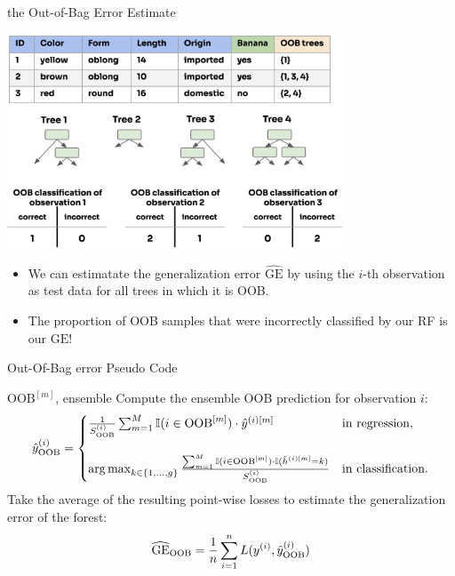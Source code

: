 \documentclass[11pt,compress,t,notes=noshow,xcolor=table]{beamer}
\begin{document}
\begin{vbframe}{the Out-of-Bag Error Estimate}
  
\begin{center}
  \includegraphics[width=0.75\textwidth]{figure_man/forest-oob-error.png}
\end{center}

\begin{itemize}
  \item We can estimatate the generalization error $\widehat{\mathrm{GE}}$ by using the $i$-th observation as test data for all trees in which it is OOB. 
  \item The proportion of OOB samples that were incorrectly classified by our RF is our $\widehat{\mathrm{GE}}$!
\end{itemize}

\end{vbframe}

\begin{vbframe}{Out-Of-Bag error Pseudo Code}
\begin{algorithm}[H]
  \footnotesize
  \caption*{Out-Of-Bag error calculation}
  \begin{algorithmic}[1]
     $\text{OOB}^{[m]}$, ensemble
      \State Compute the ensemble OOB prediction for observation $i$:
      $$\hat{y}^{(i)}_{\text{OOB}} = \begin{cases}
      \frac{1}{S_{\text{OOB}}^{(i)}} \sum_{m = 1}^{M} 
      \mathbb{I}(i \in \text{OOB}^{[m]}) \cdot \hat{y}^{(i)[m]} & \text{in regression,} 
      \\ \phantom{x} \\
      \operatorname*{arg\,max}_{k \in \{1, \ldots, g\}} 
      \frac{\sum_{m = 1}^{M} \mathbb{I}(i \in \text{OOB}^{[m]}) \cdot 
      \mathbb{I}(\hat{h}^{(i)[m]} = k)} {S_{\text{OOB}}^{(i)}} &
      \text{in classification.}
      \end{cases}$$
    \EndFor
    \State Take the average of the resulting point-wise losses to estimate the generalization error of the forest: $$\widehat{\mathrm{GE}}_{\text{OOB}} = \frac{1}{n} \sum\limits_{i=1}^n L(y^{(i)}, \hat{y}^{(i)}_{\text{OOB}})$$
  
  \end{algorithmic}
\end{algorithm}
\end{vbframe}
\end{document}
